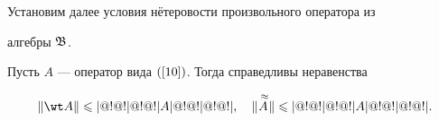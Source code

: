 Установим далее условия н\"етеровости произвольного оператора из


алгебры $\frak B$.





\begin{lem}


Пусть $A$ --- оператор вида $(\ref{10})$. Тогда справедливы неравенства


\begin{equation}


\|\wt A\|\leqslant \trivert A \trivert, \quad


\|\apA\|\leqslant\trivert A\trivert.


\label{13}


\end{equation}


\end{lem}





